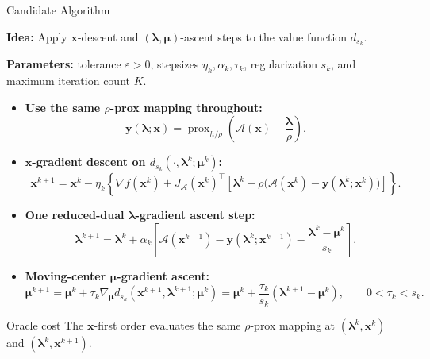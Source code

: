 \documentclass[handout,compress,9pt]{beamer}
\newcommand{\blue}[1]{\textcolor{ddlblue}{#1}}
\newcommand{\bx}{\bm{x}}
\newcommand{\by}{\bm{y}}
\newcommand{\bmu}{\bm{\mu}}
\newcommand{\blmbd}{\bm{\lambda}}
\newcommand{\calA}{\mathcal{A}}
\begin{document}
\begin{frame}{Candidate Algorithm}
\footnotesize

\noindent\textbf{Idea:} Apply $\bx$-descent and $(\blmbd,\bmu)$-ascent steps to the value function $d_{s_k}$.

\noindent\textbf{Parameters:} tolerance $\varepsilon>0$, stepsizes
$\eta_k,\alpha_k,\tau_k$, regularization $s_k$, and maximum iteration count $K$.

\vspace{0.08cm}
\begin{itemize}
  \item[\blue{$\triangleright$}]
  \textbf{Use the same $\rho$-prox mapping throughout:}
  \begin{equation*}
    \by(\blmbd;\bx)
    =\operatorname{prox}_{h/\rho}
    \left(\calA(\bx)+\frac{\blmbd}{\rho}\right).
  \end{equation*}

  \item[\blue{$\triangleright$}]
  \textbf{$\bx$-gradient descent on $d_{s_k}(\cdot,\blmbd^k;\bmu^k)$:}
  \begin{equation*}
    \bx^{k+1}=\bx^k-\eta_k
    \left\{\nabla f(\bx^k)+J_{\calA}(\bx^k)^\top
    \left[\blmbd^k+\rho\bigl(\calA(\bx^k)-\by(\blmbd^k;\bx^k)\bigr)\right]\right\}.
  \end{equation*}

  \item[\blue{$\triangleright$}]
  \textbf{One reduced-dual $\blmbd$-gradient ascent step:}
  \begin{equation*}
    \blmbd^{k+1}=\blmbd^k+\alpha_k
    \left[\calA(\bx^{k+1})-\by(\blmbd^k;\bx^{k+1})
    -\frac{\blmbd^k-\bmu^k}{s_k}\right].
  \end{equation*}

  \item[\blue{$\triangleright$}]
  \textbf{Moving-center $\bmu$-gradient ascent:}
  \begin{equation*}
    \bmu^{k+1}
    =\bmu^k+\tau_k\nabla_{\bmu}
    d_{s_k}(\bx^{k+1},\blmbd^{k+1};\bmu^k)
    =\bmu^k+\frac{\tau_k}{s_k}(\blmbd^{k+1}-\bmu^k),
    \qquad 0<\tau_k<s_k.
  \end{equation*}
\end{itemize}

\begin{block}{Oracle cost}
The $\bx$-first order evaluates the same $\rho$-prox mapping at
$(\blmbd^k,\bx^k)$ and $(\blmbd^k,\bx^{k+1})$.
\end{block}
\end{frame}
\end{document}
